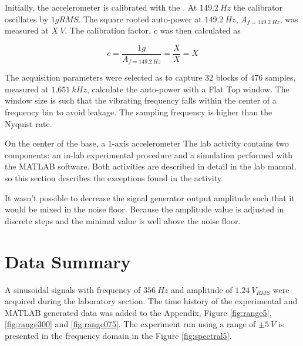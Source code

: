 \documentclass[10pt,letterpaper,twocolumn]{article}
\begin{document}
	Initially, the accelerometer is calibrated with the . At $ 149.2\ Hz $ the calibrator oscillates by $ 1 g RMS $. The square rooted auto-power at $ 149.2\ Hz $, $ A_{f = 149.2\ Hz} $, was measured at $ X\ V $. The calibration factor, $ c $ was then calculated as
	
	\begin{equation}
	c = \frac{1 g}{A_{f = 149.2\ Hz}} = \frac{X}{X} = X
	\end{equation} 
	
	The acquisition parameters were selected as to capture $ 32 $ blocks of $ 476 $ samples, measured at $ 1.651\ kHz $, calculate the auto-power with a Flat Top window. The window size is such that the vibrating frequency falls within the center of a frequency bin to avoid leakage. The sampling frequency is higher than the Nyquist rate.
	
	 
	
	On the center of the base, a 1-axis accelerometer 
    The lab activity contains two components: an in-lab experimental procedure and a simulation performed with the MATLAB software. Both activities are described in detail in the lab manual, so this section describes the exceptions found in the activity.
    
    It wasn't possible to decrease the signal generator output amplitude such that it would be mixed in the noise floor. Because the amplitude value is adjusted in discrete steps and the minimal value is well above the noise floor.


\section{Data Summary}
    A sinusoidal signals with frequency of $356\ Hz$ and amplitude of $1.24\ V_{RMS}$ were acquired during the laboratory section. The time history of the experimental and MATLAB generated data was added to the Appendix, Figure \ref{fig:range5}, \ref{fig:range300} and \ref{fig:range075}. The experiment run using a range of $\pm 5\ V$ is presented in the frequency domain in the Figure \ref{fig:spectral5}.
    
\end{document}
